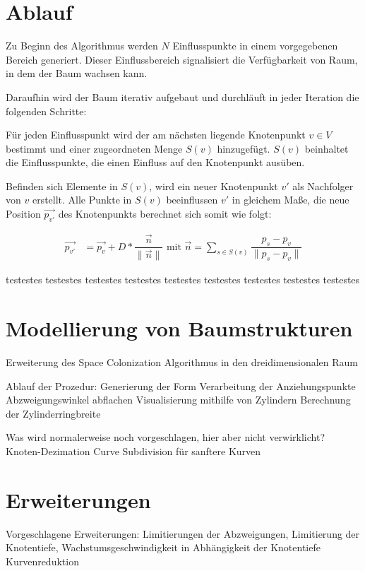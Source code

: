 \section{Ablauf}
Zu Beginn des Algorithmus werden $N$ Einflusspunkte in einem vorgegebenen Bereich generiert. Dieser Einflussbereich signalisiert die Verfügbarkeit von Raum, in dem der Baum wachsen kann.  

Daraufhin wird der Baum iterativ aufgebaut und durchläuft in jeder Iteration die folgenden Schritte:

\begin{description}[labelindent]
	\item[\boldmath$1.$] Für jeden Einflusspunkt wird der am nächsten liegende Knotenpunkt $v\in V$ bestimmt und einer zugeordneten Menge $S(v)$ hinzugefügt. $S(v)$ beinhaltet die Einflusspunkte, die einen Einfluss auf den Knotenpunkt ausüben.\\
	
	\item[\boldmath$2.$] Befinden sich Elemente in $S(v)$, wird ein neuer Knotenpunkt $v'$ als Nachfolger von $v$ erstellt. Alle Punkte in $S(v)$ beeinflussen $v'$ in gleichem Maße, die neue Position $\overrightarrow{p_{v'}}$ des Knotenpunkts berechnet sich somit wie folgt:
	
	\begin{equation}
	\begin{array}{ll}
	\overrightarrow{p_{v'}} & = \overrightarrow{p_v} + D * \dfrac{\overrightarrow{n} }{\lVert\overrightarrow{n}\rVert} \text{  mit  } \overrightarrow{n} = \sum\limits_{s \in S(v)}\dfrac{p_s - p_v}{\lVert p_s - p_v \rVert}
	\end{array}
	\end{equation} 
	
	\item[\boldmath$3.$] testestes testestes testestes testestes testestes testestes testestes testestes testestes 
\end{description}

\section{Modellierung von Baumstrukturen}

Erweiterung des Space Colonization Algorithmus in den dreidimensionalen Raum

Ablauf der Prozedur:
Generierung der Form
Verarbeitung der Anziehungspunkte
Abzweigungswinkel abflachen
Visualisierung mithilfe von Zylindern
Berechnung der Zylinderringbreite


Was wird normalerweise noch vorgeschlagen, hier aber nicht verwirklicht?
Knoten-Dezimation
Curve Subdivision für sanftere Kurven
\section{Erweiterungen}

Vorgeschlagene Erweiterungen: Limitierungen der Abzweigungen, Limitierung der Knotentiefe, Wachstumsgeschwindigkeit in Abhängigkeit der Knotentiefe
Kurvenreduktion
